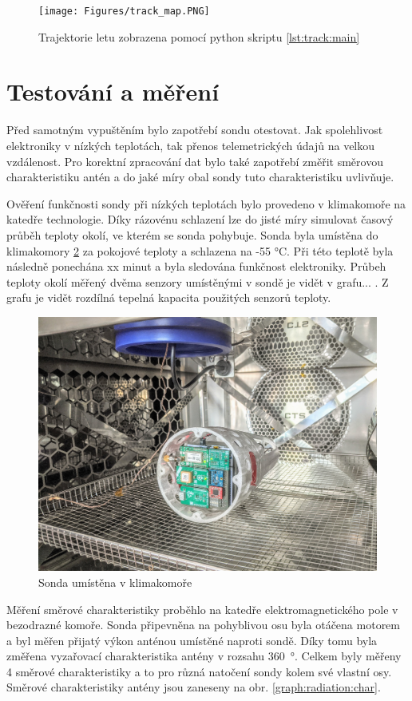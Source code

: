 \documentclass[twoside]{ctuthesis}
\theoremstyle{plain}
\theoremstyle{definition}
\theoremstyle{note}
\begin{document}
	\begin{figure}[hbtp]
		\centering
		\texttt{[image: Figures/track\_map.PNG]}
		\caption{Trajektorie letu zobrazena pomocí python skriptu \ref{lst:track:main}}
		\label{fig:track:map}
	\end{figure}



	\section{Testování a měření}
	Před samotným vypuštěním bylo zapotřebí sondu otestovat. Jak spolehlivost elektroniky v nízkých teplotách, tak přenos telemetrických údajů na velkou vzdálenost. Pro korektní zpracování dat bylo také zapotřebí změřit směrovou charakteristiku antén a do jaké míry obal sondy tuto charakteristiku uvlivňuje.

	Ověření funkčnosti sondy při nízkých teplotách bylo provedeno v klimakomoře na katedře technologie. Díky rázovénu schlazení lze do jisté míry simulovat časový průběh teploty okolí, ve kterém se sonda pohybuje. Sonda byla umístěna do klimakomory \ref{fig:sonda:klimakomora} za pokojové teploty a schlazena na -55 °C. Při této teplotě byla následně ponechána xx minut a byla sledována funkčnost elektroniky. Průbeh teploty okolí měřený dvěma senzory umístěnými v sondě je vidět v grafu... . Z grafu je vidět rozdílná tepelná kapacita použitých senzorů teploty. 

	\begin{figure}[hbtp]
		\centering
		\includegraphics[width=.7\textwidth]{Figures/sonda_klimakomora.jpg}
		\caption{Sonda umístěna v klimakomoře}
		\label{fig:sonda:klimakomora}
	\end{figure}

	Měření směrové charakteristiky proběhlo na katedře elektromagnetického pole v bezodrazné komoře. Sonda připevněna na pohyblivou osu byla otáčena motorem a byl měřen přijatý výkon anténou umístěné naproti sondě. Díky tomu byla změřena vyzařovací charakteristika antény v rozsahu 360~°. Celkem byly měřeny 4 směrové charakteristiky a to pro různá natočení sondy kolem své vlastní osy. Směrové charakteristiky antény jsou zaneseny na obr. \ref{graph:radiation:char}.
\end{document}
